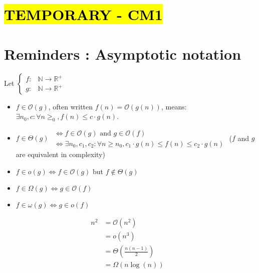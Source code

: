 \part*{\hl{TEMPORARY - CM1}}

\part{Reminders : Asymptotic notation}

Let 
$ \left\{
\begin{array}{ll}
f :& \mathbb{N} \rightarrow \mathbb{R}^+\\
g :& \mathbb{N} \rightarrow \mathbb{R}^+
\end{array} \right.$ 

\begin{itemize}
\renewcommand{\labelitemi}{$\bullet$}
	\item  $f \in \mathcal{O}(g)$, often written $f(n) = \mathcal{O}(g(n))$, means: $\exists n_0, c : \forall n \geq _0, f(n) \leq c \cdot g(n)$.
	\item 	
	$f \in \Theta(g)$ $\begin{array}{l} 
	   \Leftrightarrow f \in \mathcal{O}(g)  \text{ and } g \in \mathcal{O}(f) \\
	\Leftrightarrow  \exists n_0, c_1, c_2 : \forall n\geq n_0, c_1 \cdot g(n)\leq f(n) \leq c_2 \cdot g(n) 
	\end{array}$	
	($f$ and $g$ are equivalent in complexity)
\item $f \in o(g) \Leftrightarrow f \in \mathcal{O}(g)$ but $f \notin \Theta(g)$
\item  $f \in \Omega(g) \Leftrightarrow g \in \mathcal{O}(f)$
\item $f \in \omega(g) \Leftrightarrow g \in o(f)$
\end{itemize}

\vspace{0.5cm}
\begin{example}
\begin{leftbar}
\begin{align*} 
	   n^2 & = \mathcal{O}(n^2) &\\
		 & = o(n^3) &\\
		 & = \Theta \left(\frac{n (n-1)}{2}\right) &\\
		& = \Omega (n \log (n))& 
	\end{align*}
	\end{leftbar}
\end{example}

